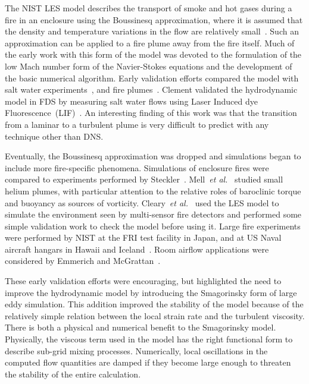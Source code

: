 The  NIST LES model  describes the  transport of  smoke and  hot gases during  a fire  in an  enclosure using  the  Boussinesq approximation, where it is assumed that the density and temperature variations in the flow are relatively small~\cite{Rehm:1,Rehm:SIAM83,Rehm:ANM85,Rehm:IAFSS3}. Such an approximation  can be  applied  to a  fire  plume away  from the  fire itself. Much of  the early  work  with this  form of  the model  was devoted  to  the  formulation of  the  low  Mach  number form  of  the Navier-Stokes equations and  the development  of the  basic numerical algorithm.   Early validation  efforts  compared the  model with  salt water experiments~\cite{Baum:1,McGrattan:1,Rehm:IAFSS5},   and  fire plumes~\cite{Baum:IAFSS5,Baum:2,Baum:3,Baum:4}.  Clement validated the hydrodynamic model  in FDS by  measuring salt water flows  using Laser Induced dye   Fluorescence~(LIF)~\cite{Clement:1}.  An   interesting finding  of this work was  that the  transition from  a laminar  to a turbulent plume is very difficult  to predict with any technique other than DNS.

Eventually, the  Boussinesq approximation was  dropped and simulations began  to   include  more  fire-specific   phenomena.  Simulations  of enclosure   fires   were   compared   to  experiments   performed   by Steckler~\cite{McGrattan:4}.  Mell~{\em  et al.}~\cite{Mell:1} studied small helium  plumes, with particular attention to  the relative roles of  baroclinic torque and  buoyancy as  sources of  vorticity.  Cleary~{\em  et
al.}~\cite{LES:6}  used   the  LES  model  to  simulate  the environment  seen by  multi-sensor fire  detectors and  performed some simple validation work to check the model before using it.  Large fire experiments were performed by NIST  at the FRI test facility in Japan, and at US Naval aircraft hangars in Hawaii and Iceland~\cite{Davis:1}. Room   airflow   applications   were   considered  by   Emmerich   and McGrattan~\cite{Emmerich:1,Emmerich:2}.

These early validation efforts were encouraging, but highlighted the  need  to  improve  the  hydrodynamic  model  by  introducing  the Smagorinsky form of large eddy simulation.  This addition improved the stability  of the  model  because of  the  relatively simple  relation between the  local strain rate  and the turbulent viscosity.  There is both   a   physical  and   numerical   benefit   to  the   Smagorinsky model. Physically,  the viscous term used  in the model  has the right functional  form to describe  sub-grid mixing  processes. Numerically, local oscillations in the computed  flow quantities are damped if they become  large   enough  to  threaten  the  stability   of  the  entire calculation.






